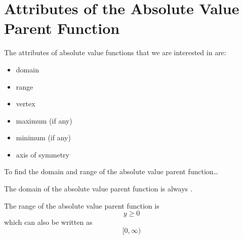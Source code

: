 

\section*{Attributes of the Absolute Value Parent Function}

The attributes of absolute value functions that we are interested in are:
\begin{itemize}[itemsep=0.1\baselineskip]
    \item domain
    \item range
    \item vertex
    \item maximum (if any)
    \item minimum (if any)
    \item axis of symmetry
\end{itemize}




\begin{myConceptSteps}{To find the domain and range of the absolute value parent function\dots}
\end{myConceptSteps}



\begin{center}
    \begin{tcolorbox}[width=4in]
        The domain of the absolute value parent function 
        is always .
    \end{tcolorbox}
\end{center}



\begin{center}
    \begin{tcolorbox}[width=4in]
        The range of the absolute value parent function 
        is 
        \[y \geq 0\]
        which can also be written as
        \[[0,\infty)\]
    \end{tcolorbox}
\end{center}



